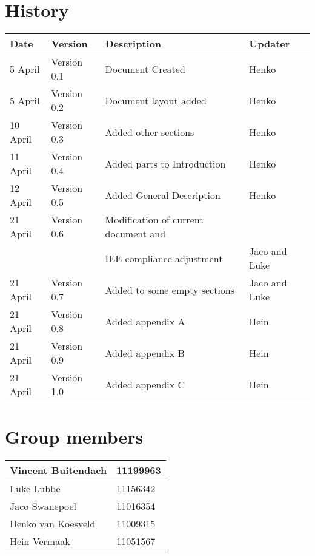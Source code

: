 
\section{History}

\begin{center}

\begin{tabular}{|l|l|l|l|}

\hline
Date & Version & Description&Updater\\ 
\hline
5 April& Version 0.1 & Document Created&Henko\\ 
\hline
5 April& Version 0.2 & Document layout added&Henko\\ 
\hline
10 April & Version 0.3 & Added other sections&Henko\\ 
\hline
11 April & Version 0.4 & Added parts to Introduction&Henko\\ 
\hline
12 April & Version 0.5 & Added General Description&Henko\\ 
\hline
21 April & Version 0.6 & Modification of current document and&\\
&& IEE compliance adjustment&Jaco and Luke\\ 
\hline
21 April & Version 0.7 & Added to some empty sections &Jaco and Luke\\ 
\hline
21 April & Version 0.8 & Added appendix A&Hein\\ 
\hline
21 April & Version 0.9 & Added appendix B&Hein\\ 
\hline
21 April & Version 1.0 & Added appendix C&Hein\\ 
\hline

\end{tabular}

\vfill
\section{Group members}

\begin{tabular}{|l|l|}

\hline
Vincent Buitendach & 11199963\\
\hline
Luke Lubbe & 11156342\\
\hline
Jaco Swanepoel & 11016354\\
\hline
Henko van Koesveld & 11009315\\
\hline
Hein Vermaak & 11051567\\
\hline

\end{tabular}

\end{center}

